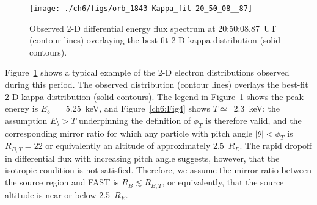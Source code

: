 
  \begin{figure}
    \centering
    \noindent\texttt{[image: ./ch6/figs/orb\_1843-Kappa\_fit-20\_50\_08\_\_87]}
    \caption[Example two-dimensional fit of inverted V precipitation (Orbit
    1843)]{Observed 2-D differential energy flux spectrum at 20:50:08.87~UT
      (contour lines) overlaying the best-fit 2-D kappa distribution (solid
      contours).}
    \label{ch6:Fig5}
  \end{figure}


  Figure~\ref{ch6:Fig5} shows a typical example of the 2-D electron
  distributions observed during this period. The observed distribution (contour
  lines) overlays the best-fit 2-D kappa distribution (solid contours). The
  legend in Figure~\ref{ch6:Fig5} shows the peak energy is $E_b =$~5.25~keV, and
  Figure~\ref{ch6:Fig4} shows $T \simeq$~2.3~keV; the assumption $E_b > T$
  underpinning the definition of $\phi_T$ is therefore valid, and the
  corresponding mirror ratio for which any particle with pitch angle $\vert
  \theta \vert < \phi_T$ is $R_{B,T} = 22$ or equivalently an altitude of
  approximately 2.5~$R_E$. The rapid dropoff in differential flux with
  increasing pitch angle suggests, however, that the isotropic condition is not
  satisfied. Therefore, we assume the mirror ratio between the source region and
  FAST is $R_B \lesssim R_{B,T}$, or equivalently, that the source altitude is
  near or below 2.5~$R_E$.



